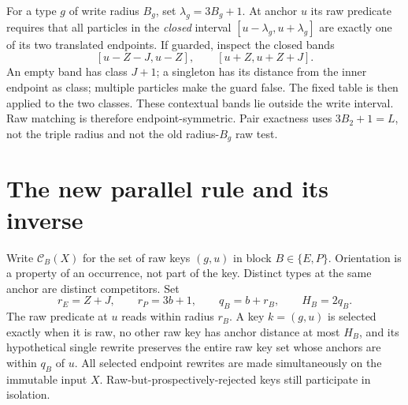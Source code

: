 \documentclass[11pt,a4paper]{article}
\numberwithin{equation}{section}
\newcommand{\calC}{\mathcal C}\newcommand{\gebit}{\operatorname{ge}}\newcommand{\bitlen}{\operatorname{bits}}
\begin{document}
For a type $g$ of write radius $B_g$, set $\lambda_g=3B_g+1$. At anchor $u$ its raw predicate requires that all particles in the \emph{closed} interval $[u-\lambda_g,u+\lambda_g]$ are exactly one of its two translated endpoints. If guarded, inspect the closed bands
\[
[u-Z-J,u-Z],\qquad [u+Z,u+Z+J].
\]
An empty band has class $J+1$; a singleton has its distance from the inner endpoint as class; multiple particles make the guard false. The fixed table is then applied to the two classes. These contextual bands lie outside the write interval. Raw matching is therefore endpoint-symmetric. Pair exactness uses $3B_2+1=L$, not the triple radius and not the old radius-$B_g$ raw test.

\section{The new parallel rule and its inverse}
Write $\calC_B(X)$ for the set of raw keys $(g,u)$ in block $B\in\{E,P\}$. Orientation is a property of an occurrence, not part of the key. Distinct types at the same anchor are distinct competitors. Set
\[
r_E=Z+J,\qquad r_P=3b+1,\qquad q_B=b+r_B,\qquad H_B=2q_B.
\]
The raw predicate at $u$ reads within radius $r_B$. A key $k=(g,u)$ is selected exactly when it is raw, no other raw key has anchor distance at most $H_B$, and its hypothetical single rewrite preserves the entire raw key set whose anchors are within $q_B$ of $u$. All selected endpoint rewrites are made simultaneously on the immutable input $X$. Raw-but-prospectively-rejected keys still participate in isolation.
\end{document}
